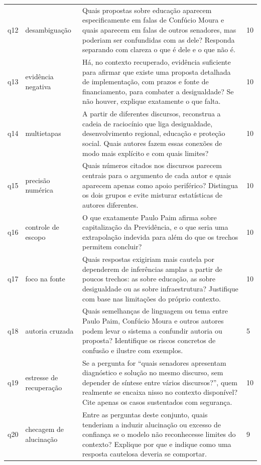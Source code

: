 \begin{longtable}{@{}p{}p{}p{}p{}@{}}
q12 & desambiguação & Quais propostas sobre educação aparecem especificamente em falas de Confúcio Moura e quais aparecem em falas de outros senadores, mas poderiam ser confundidas com as dele? Responda separando com clareza o que é dele e o que não é. & 10 \\
q13 & evidência negativa & Há, no contexto recuperado, evidência suficiente para afirmar que existe uma proposta detalhada de implementação, com prazos e fonte de financiamento, para combater a desigualdade? Se não houver, explique exatamente o que falta. & 10 \\
q14 & multietapas & A partir de diferentes discursos, reconstrua a cadeia de raciocínio que liga desigualdade, desenvolvimento regional, educação e proteção social. Quais autores fazem essas conexões de modo mais explícito e com quais limites? & 10 \\
q15 & precisão numérica & Quais números citados nos discursos parecem centrais para o argumento de cada autor e quais aparecem apenas como apoio periférico? Distingua os dois grupos e evite misturar estatísticas de autores diferentes. & 10 \\
q16 & controle de escopo & O que exatamente Paulo Paim afirma sobre capitalização da Previdência, e o que seria uma extrapolação indevida para além do que os trechos permitem concluir? & 10 \\
q17 & foco na fonte & Quais respostas exigiriam mais cautela por dependerem de inferências amplas a partir de poucos trechos: as sobre educação, as sobre desigualdade ou as sobre infraestrutura? Justifique com base nas limitações do próprio contexto. & 10 \\
q18 & autoria cruzada & Quais semelhanças de linguagem ou tema entre Paulo Paim, Confúcio Moura e outros autores podem levar o sistema a confundir autoria ou proposta? Identifique os riscos concretos de confusão e ilustre com exemplos. & 5 \\
q19 & estresse de recuperação & Se a pergunta for ``quais senadores apresentam diagnóstico e solução no mesmo discurso, sem depender de síntese entre vários discursos?'', quem realmente se encaixa nisso no contexto disponível? Cite apenas os casos sustentados com segurança. & 10 \\
q20 & checagem de alucinação & Entre as perguntas deste conjunto, quais tenderiam a induzir alucinação ou excesso de confiança se o modelo não reconhecesse limites do contexto? Explique por que e indique como uma resposta cautelosa deveria se comportar. & 9 \\
\hline
\end{longtable}
\endgroup

